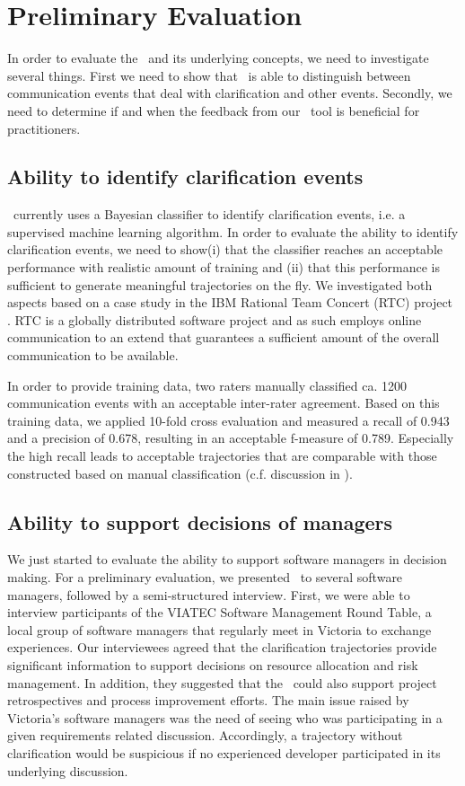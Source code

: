\section{Preliminary Evaluation}
In order to evaluate the \viss\ and its underlying concepts, we need to investigate several things.
First we need to show that \viss\ is able to distinguish between communication events that deal with clarification and other events. 
Secondly, we need to determine if and when the feedback from our \viss\ tool is beneficial for practitioners. 

\subsection{Ability to identify clarification events}
\viss\ currently uses a Bayesian classifier to identify clarification events, i.e. a supervised machine learning algorithm.
In order to evaluate the ability to identify clarification events, we need to show(i)  that the classifier reaches an acceptable performance with realistic amount of training and (ii) that this performance is sufficient to generate meaningful trajectories on the fly.
We investigated both aspects based on a case study in the IBM Rational Team Concert (RTC) project \cite{Knauss2012f}.
RTC is a globally distributed software project and as such employs online communication to an extend that guarantees a sufficient amount of the overall communication to be available.

In order to provide training data, two raters manually classified ca. 1200 communication events with an acceptable inter-rater agreement.  
Based on this training data, we applied 10-fold cross evaluation and measured a recall of 0.943 and a precision of  0.678, resulting in an acceptable f-measure of 0.789.
Especially the high recall leads to acceptable trajectories that are comparable with those constructed based on manual classification (c.f. discussion in \cite{Knauss2012f}).

\subsection{Ability to support decisions of managers}
We just started to evaluate the ability to support software managers in decision making. 
For a preliminary evaluation, we presented \viss\ to several software managers, followed by a semi-structured interview.
First, we were able to interview participants of the VIATEC Software Management Round Table, a local group of software managers that regularly meet in Victoria to exchange experiences.
Our interviewees agreed that the clarification trajectories provide significant information to support decisions on resource allocation and risk management. 
In addition, they suggested that the \viss\ could also support project retrospectives and process improvement efforts. 
The main issue raised by Victoria's software managers was the need of seeing who was participating in a given requirements related discussion. 
Accordingly, a trajectory without clarification would be suspicious if no experienced developer participated in its underlying discussion. 

